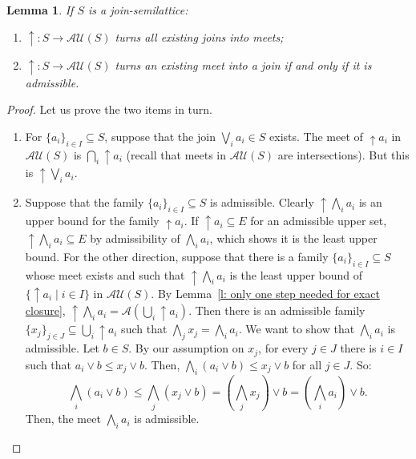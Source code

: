 \documentclass[11pt,a4paper,reqno]{amsart}
\newcommand{\tbigwedge}{\mathop{\textstyle \bigwedge }}%
\newcommand{\tbigvee}{\mathop{\textstyle \bigvee }}%
\newtheorem{lemma}[theorem]{Lemma}
\theoremstyle{definition}
\theoremstyle{remark}
\newcommand{\ca}[1]{\mathcal{#1}}
\newcommand{\ve}{\vee}
\newcommand{\bca}{\bigcap}
\newcommand{\up}{{\uparrow}}
\begin{document}
{\begin{lemma}\label{l: up preserves meet iff exact}\label{l: uparrow turns exact meets into joins}
    If $S$ is a join-semilattice:
    \begin{enumerate}
        \item \label{up preserves all finite joins}$\up:S\to \ca{AU}(S)$ turns all existing joins into meets;
        \item \label{up preserves the lc meets} $\up:S\to \ca{AU}(S)$ turns an existing meet into a join if and only if it is admissible.
    \end{enumerate}
    
\end{lemma}
\begin{proof}
Let us prove the two items in turn.
\begin{enumerate}
    \item For $\{a_i\}_{i\in I}\subseteq S$, suppose that the join $\tbigvee_i a_i\in S$ exists. The meet of $\up a_i$ in $\ca{AU}(S)$ is $\bca_i\up a_i$ (recall that meets in $\ca{AU}(S)$ are intersections). But this is $\up \tbigvee_i a_i$.   
    \item  Suppose that the family $\{a_i\}_{i\in I}\subseteq S$ is admissible. Clearly $\up \tbigwedge_i a_i$ is an upper bound for the family $\up a_i$. If $\up a_i\subseteq E$ for an admissible upper set, $\up \tbigwedge_i a_i\subseteq E$ by admissibility of $\tbigwedge_i a_i$, which shows it is the least upper bound. For the other direction, suppose that there is a family $\{a_i\}_{i\in I}\subseteq S$ whose meet exists and such that $\up \tbigwedge_i a_i$ is the least upper bound of $\{\up a_i\mid i\in I\}$ in $\ca{AU}(S)$. By Lemma~\ref{l: only one step needed for exact closure}, $\up \tbigwedge_i a_i=\ca{A}(\bigcup_i \up a_i)$. Then there is an admissible family $\{x_j\}_{j\in J}\subseteq \bigcup_i \up a_i$ such that $\tbigwedge_j x_j=\tbigwedge_i a_i$. We want to show that $\tbigwedge_i a_i$ is admissible. Let $b\in S$. By our assumption on $x_j$, for every $j\in J$ there is $i\in I$ such that $a_i\ve b\leq x_j\ve b$. Then, $\tbigwedge_i (a_i\ve b)\leq x_j\ve b$ for all $j\in J$. So:
\[
\tbigwedge_i (a_i \ve b)\leq \tbigwedge_j (x_j\ve b)=(\tbigwedge_j x_j)\ve b=(\tbigwedge_i a_i)\ve b.
\]
    Then, the meet $\tbigwedge_i a_i$ is admissible. \qedhere
\end{enumerate}
\end{proof}


}
\end{document}
